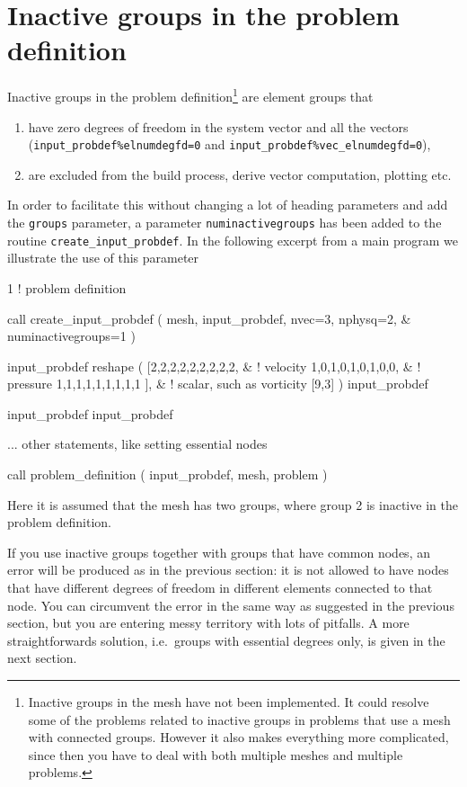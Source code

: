\section{Inactive groups in the problem definition}
\label{sec:inactivegroups}
Inactive groups in the problem definition\footnote{Inactive groups in the mesh
have not been implemented. It could resolve some of the problems
related to inactive groups in problems that use a mesh with connected groups.
However it also makes everything more complicated, since then you have to deal
with both multiple meshes and multiple problems.}
 are element groups that 
\begin{enumerate}
   \item have zero degrees of freedom in the system vector and all the vectors
         (\texttt{input\_probdef\%elnumdegfd=0} and 
          \texttt{input\_probdef\%vec\_elnumdegfd=0}),
   \item are excluded from the build process, derive vector computation,
         plotting etc.
\end{enumerate}
In order to facilitate this without changing a lot of heading parameters and
add the \texttt{groups} parameter, a parameter \texttt{numinactivegroups}
has been added to the
routine \texttt{create\_input\_probdef}. In the following excerpt from a main
program we illustrate the use of this parameter
\begin{listing}{1}
! problem definition

  call create_input_probdef ( mesh, input_probdef, nvec=3, nphysq=2, &
    numinactivegroups=1 )

  input_probdef%
      reshape ( [2,2,2,2,2,2,2,2,2,    &  ! velocity
                 1,0,1,0,1,0,1,0,0,    &  ! pressure
                 1,1,1,1,1,1,1,1,1 ], &  ! scalar, such as vorticity
                 [9,3] )
  input_probdef%

  input_probdef%
  input_probdef%

  ... other statements, like setting essential nodes

  call problem_definition ( input_probdef, mesh, problem )

\end{listing}
Here it is assumed that the mesh has two groups, where group 2 is inactive in
the problem definition.

If you use inactive groups together with groups that have common nodes, an
error will be produced as in the previous section: it is not allowed to have
nodes that have different degrees of freedom in different elements connected to
that node. You can circumvent the error in the same way as suggested in the
previous section, but you are entering messy territory with lots of pitfalls.
A more straightforwards solution, i.e.\ groups with essential degrees only,
is given in the next section.

